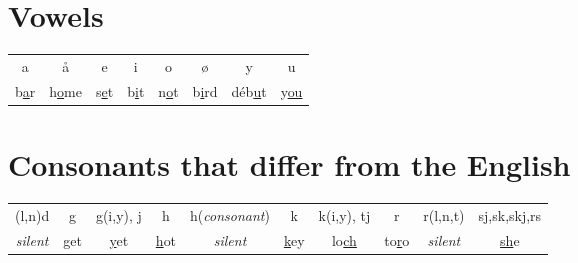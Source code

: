\section*{Vowels}

\begin{tabular}{cccccccc}
a & \aa & e & i & o & \o & y & u \\
b\underline{a}r & h\underline{o}me & s\underline{e}t & b\underline{i}t & n\underline{o}t & b\underline{i}rd & d\'eb\underline{u}t & y\underline{ou} \\
\end{tabular}

\section*{Consonants that differ from the English}

\begin{tabular}{cccccccccc}
(l,n)d & g & g(i,y), j & h & h(\textit{consonant}) & k & k(i,y), tj & r & r(l,n,t) & sj,sk,skj,rs \\
\textit{silent} & \underline{g}et & \underline{y}et & \underline{h}ot & \textit{silent} & \underline{k}ey & lo\underline{ch} & to\underline{r}o & \textit{silent} & \underline{sh}e \\
\end{tabular}
